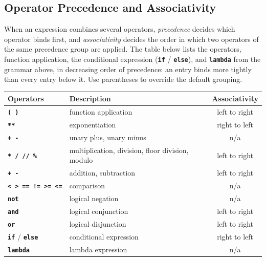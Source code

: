 \subsection*{Operator Precedence and Associativity}

When an expression combines several operators, \emph{precedence} decides
which operator binds first, and \emph{associativity} decides the order in
which two operators of the same precedence group are applied. The table
below lists the operators, function application, the conditional
expression (\textbf{\texttt{if}} / \textbf{\texttt{else}}), and
\textbf{\texttt{lambda}} from the grammar above, in decreasing order of
precedence: an entry binds more tightly than every entry below it. Use
parentheses to override the default grouping.

\begin{center}
  \begin{tabular}{l|l|c}
    Operators & Description & Associativity \\ \hline
    \texttt{\textbf{( )}} & function application & left to right \\
    \texttt{\textbf{**}} & exponentiation & right to left \\
    \texttt{\textbf{+}}\ \texttt{\textbf{-}} & unary plus, unary minus & n/a \\
    \texttt{\textbf{*}}\ \texttt{\textbf{/}}\ \texttt{\textbf{//}}\ \texttt{\textbf{\%}} & multiplication, division, floor division, modulo & left to right \\
    \texttt{\textbf{+}}\ \texttt{\textbf{-}} & addition, subtraction & left to right \\
    \texttt{\textbf{<}}\ \texttt{\textbf{>}}\ \texttt{\textbf{==}}\ \texttt{\textbf{!=}}\ \texttt{\textbf{>=}}\ \texttt{\textbf{<=}} & comparison & n/a \\
    \textbf{\texttt{not}} & logical negation & n/a \\
    \textbf{\texttt{and}} & logical conjunction & left to right \\
    \textbf{\texttt{or}} & logical disjunction & left to right \\
    \textbf{\texttt{if}} / \textbf{\texttt{else}} & conditional expression & right to left \\
    \textbf{\texttt{lambda}} & lambda expression & n/a \\
  \end{tabular}
\end{center}

